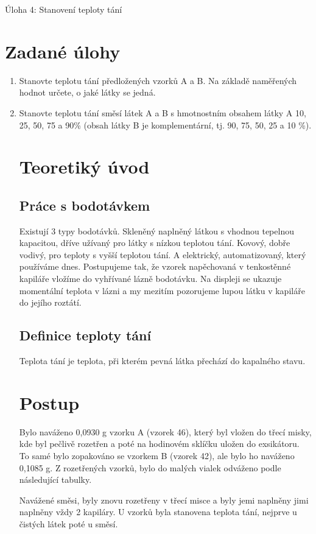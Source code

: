 \documentclass[13pt, a4paper, twoside]{article}
\begin{document}
\begin{center}
    \Huge
    Úloha 4: Stanovení teploty tání
\end{center}
\onehalfspacing \large
\section*{Zadané úlohy}
\begin{enumerate}
    \item Stanovte teplotu tání předložených vzorků A a B. Na základě naměřených hodnot určete,
    o jaké látky se jedná.
    \item    Stanovte teplotu tání směsí látek A a B s hmotnostním obsahem látky A 10, 25, 50, 75
    a 90\% (obsah látky B je komplementární, tj. 90, 75, 50, 25 a 10 \%).
     
\section*{Teoretiký úvod}
\subsection*{Práce s bodotávkem}
Existují 3 typy bodotávků. Skleněný naplněný látkou s vhodnou tepelnou kapacitou, dříve užívaný pro látky s nízkou teplotou tání. Kovový, dobře vodivý, pro teploty s vyšší teplotou tání. A elektrický, automatizovaný, který používáme dnes.
Postupujeme tak, že vzorek napěchovaná v tenkostěnné kapiláře vložíme do vyhřívané lázně bodotávku. Na displeji se ukazuje momentální teplota v lázni a my mezitím pozorujeme lupou látku v kapiláře do jejího roztátí.

\subsection*{Definice teploty tání}
Teplota tání je teplota, při kterém pevná látka přechází do kapalného stavu.


\section*{Postup}
Bylo naváženo 0,0930 g vzorku A (vzorek 46), který byl vložen do třecí misky, kde byl pečlivě rozetřen a poté na hodinovém sklíčku uložen do exsikátoru. To samé bylo zopakováno se vzorkem B (vzorek 42), ale bylo ho naváženo 0,1085 g. Z rozetřených vzorků, bylo do malých vialek odváženo podle následující tabulky.


Navážené směsi, byly znovu rozetřeny v třecí misce a byly jemi naplněny jimi naplněny vždy 2 kapiláry. U vzorků byla stanovena teplota tání, nejprve u čistých látek poté u směsí.


\end{enumerate}
\end{document}

